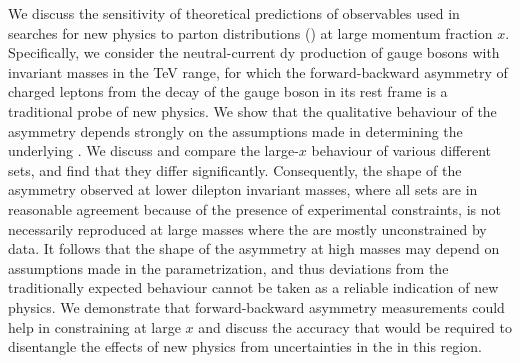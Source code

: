 We discuss the sensitivity of theoretical predictions of observables used in
searches for new physics to parton
distributions (\pdfs) at large momentum fraction $x$.
%
Specifically, we consider the neutral-current \acrlong{dy} production of
gauge bosons with invariant masses in the TeV range, for which    
the forward-backward asymmetry of charged leptons
from the decay of the gauge boson in its rest frame is a traditional
probe of new physics. We show that the qualitative  behaviour of the asymmetry 
depends strongly on the assumptions made in determining the underlying \pdfs.
%
 We discuss and compare the large-$x$
 behaviour of various different \pdf sets, and find that they 
 differ significantly.
 Consequently, the shape of the asymmetry observed at lower
 dilepton invariant masses, where all \pdf sets are in reasonable agreement 
because of  the presence of experimental constraints,
 is not necessarily reproduced at large masses where the
 \pdfs are mostly unconstrained by data.
%
 It follows that the shape 
of the asymmetry at high masses may depend on 
assumptions made in the \pdf parametrization, 
and thus deviations from the traditionally expected behaviour cannot be taken as a reliable 
indication of new physics.
%
We demonstrate that forward-backward asymmetry measurements
could help in constraining \pdfs at large $x$ and discuss the accuracy that would be required to
disentangle the effects of new physics from uncertainties in the \pdfs in this region.
